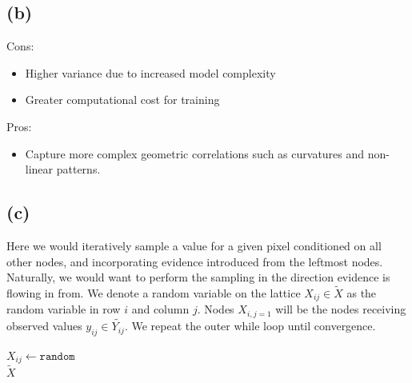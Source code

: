 \documentclass[11pt]{amsart}
\begin{document}
\subsection{(b)}

Cons:
\begin{itemize}
	\item Higher variance due to increased model complexity
	\item Greater computational cost for training
\end{itemize}
Pros:
\begin{itemize}
	\item Capture more complex geometric correlations such as curvatures and non-linear patterns.
\end{itemize}

\subsection{(c)}

Here we would iteratively sample a value for a given pixel conditioned on all other nodes, and incorporating evidence introduced from the leftmost nodes. Naturally, we would want to perform the sampling in the direction evidence is flowing in from. We denote a random variable on the lattice $X_{ij} \in \tilde{X}$ as the random variable in row $i$ and column $j$. Nodes $X_{i,j=1}$ will be the nodes receiving observed values $y_{ij} \in \tilde{Y_{ij}}$. We repeat the outer while loop until convergence.

\IncMargin{1em}
\begin{algorithm}[H]

	
	$X_{ij} \leftarrow \texttt{random}$\\
	\Return $\tilde{X}$

\end{algorithm}
\end{document}
